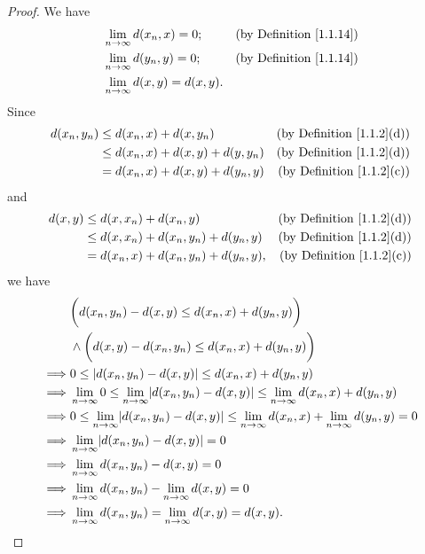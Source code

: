 \begin{proof}
    We have
    \begin{align*}
         & \lim_{n \to \infty} d(x_n, x) = 0;       & \text{(by Definition \ref{1.1.14})} \\
         & \lim_{n \to \infty} d(y_n, y) = 0;       & \text{(by Definition \ref{1.1.14})} \\
         & \lim_{n \to \infty} d(x, y)   = d(x, y).
    \end{align*}
    Since
    \begin{align*}
        d(x_n, y_n) & \leq d(x_n, x) + d(x, y_n)           & \text{(by Definition \ref{1.1.2}(d))} \\
                    & \leq d(x_n, x) + d(x, y) + d(y, y_n) & \text{(by Definition \ref{1.1.2}(d))} \\
                    & = d(x_n, x) + d(x, y) + d(y_n, y)    & \text{(by Definition \ref{1.1.2}(c))}
    \end{align*}
    and
    \begin{align*}
        d(x, y) & \leq d(x, x_n) + d(x_n, y)               & \text{(by Definition \ref{1.1.2}(d))} \\
                & \leq d(x, x_n) + d(x_n, y_n) + d(y_n, y) & \text{(by Definition \ref{1.1.2}(d))} \\
                & = d(x_n, x) + d(x_n, y_n) + d(y_n, y),   & \text{(by Definition \ref{1.1.2}(c))}
    \end{align*}
    we have
    \begin{align*}
                 & \bigg(d(x_n, y_n) - d(x, y) \leq d(x_n, x) + d(y_n, y)\bigg)                                                                   \\
                 & \land \bigg(d(x, y) - d(x_n, y_n) \leq d(x_n, x) + d(y_n, y)\bigg)                                                             \\
        \implies & 0 \leq \abs*{d(x_n, y_n) - d(x, y)} \leq d(x_n, x) + d(y_n, y)                                                                 \\
        \implies & \lim_{n \to \infty} 0 \leq \lim_{n \to \infty} \abs*{d(x_n, y_n) - d(x, y)} \leq \lim_{n \to \infty} d(x_n, x) + d(y_n, y)     \\
        \implies & 0 \leq \lim_{n \to \infty} \abs*{d(x_n, y_n) - d(x, y)} \leq \lim_{n \to \infty} d(x_n, x) + \lim_{n \to \infty} d(y_n, y) = 0 \\
        \implies & \lim_{n \to \infty} \abs*{d(x_n, y_n) - d(x, y)} = 0                                                                           \\
        \implies & \lim_{n \to \infty} d(x_n, y_n) - d(x, y) = 0                                                                                  \\
        \implies & \lim_{n \to \infty} d(x_n, y_n) - \lim_{n \to \infty} d(x, y) = 0                                                              \\
        \implies & \lim_{n \to \infty} d(x_n, y_n) = \lim_{n \to \infty} d(x, y) = d(x, y).
    \end{align*}
\end{proof}